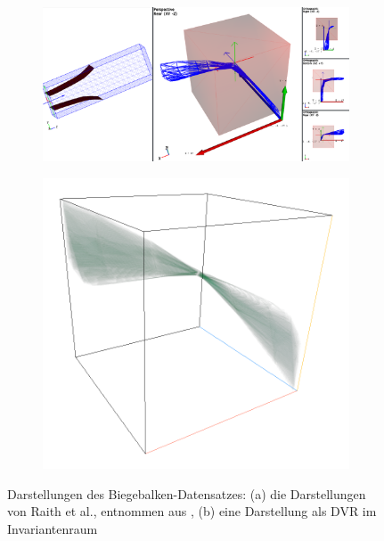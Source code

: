 \documentclass[a4paper,fontsize=12pt,toc=bib,halfparskip,ngerman]{scrartcl}
\begin{document}
\begin{figure}
	\begin{subfigure}{0.62\textwidth}
		\centering
		\includegraphics[width=\textwidth]{pictures/results/Beam/Beam_Raith.png}
		\subcaption{}
		\label{BeamRaith}
	\end{subfigure}
	\hspace*{\fill}
	\begin{subfigure}{0.32\textwidth}
		\centering
		\includegraphics[width=\textwidth]{pictures/results/Beam/Beam_InvariantSpace.png}
		\subcaption{}
		\label{BeamInvariant}
	\end{subfigure}
	\caption{Darstellungen des Biegebalken-Datensatzes: (a) die Darstellungen von Raith et al., entnommen aus \cite{raith2019tensor}, (b) eine Darstellung als DVR im Invariantenraum}
	\label{Beam}
\end{figure}
\end{document}
